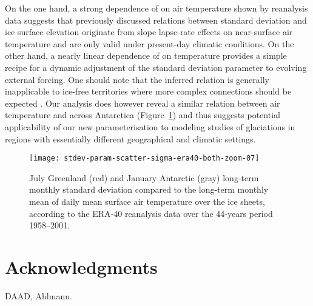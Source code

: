 \documentclass[review]{igs}
\begin{document}
On the one hand, a strong dependence of on air temperature shown by reanalysis data suggests that previously discussed relations between standard deviation and ice surface elevation \citep{fausto-etal-2009,fausto-etal-2011} originate from slope lapse-rate effects on near-surface air temperature and are only valid under present-day climatic conditions. On the other hand, a nearly linear dependence of on temperature provides a simple recipe for a dynamic adjustment of the standard deviation parameter to evolving external forcing. One should note that the inferred relation is generally inapplicable to ice-free territories where more complex connections should be expected \citep{seguinot-2013}. Our analysis does however reveal a similar relation between air temperature and across Antarctica (Figure~\ref{fig:both}) and thus suggests potential applicability of our new parameterisation to modeling studies of glaciations in regions with essentially different geographical and climatic settings.

\begin{figure}
    \centering\texttt{[image: stdev-param-scatter-sigma-era40-both-zoom-07]}
    \caption{July Greenland (red) and January Antarctic (gray) long-term monthly standard deviation compared to the long-term monthly mean of daily mean surface air temperature over the ice sheets, according to the ERA-40 reanalysis data \citep{uppala-etal-2005} over the 44-years period 1958–2001.}
    \label{fig:both}
\end{figure}


\section{Acknowledgments}

DAAD, Ahlmann.



\end{document}
